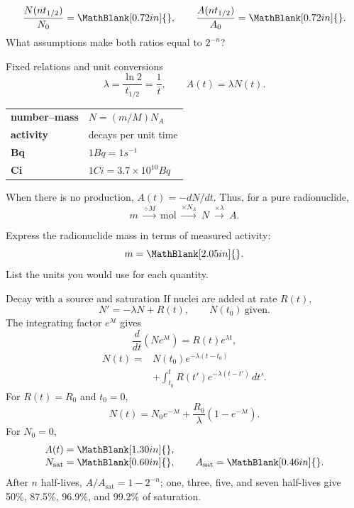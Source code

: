 \begin{handoutcolumns}
\begin{checkpoint}
\[
 \frac{N(nt_{1/2})}{N_0}=\MathBlank[0.72in]{},
 \qquad
 \frac{A(nt_{1/2})}{A_0}=\MathBlank[0.72in]{}.
\]
What assumptions make both ratios equal to $2^{-n}$?
\end{checkpoint}

\switchcolumn


\begin{fixedbox}{Fixed relations and unit conversions}
\[
 \boxed{\lambda=\frac{\ln 2}{t_{1/2}}=\frac{1}{\bar t}},
 \qquad
 \boxed{A(t)=\lambda N(t)}.
\]
\scriptsize
\begin{tabularx}{\linewidth}{@{}>{\bfseries}l X@{}}
number--mass & $N=(m/M)N_A$\\
activity & decays per unit time\\
Bq & $1\unit{Bq}=1\unit{s^{-1}}$\\
Ci & $1\unit{Ci}=3.7\times10^{10}\unit{Bq}$
\end{tabularx}
\normalsize
When there is no production, $A(t)=-dN/dt$. Thus, for a pure radionuclide,
\[
 m\ \xrightarrow{\div M}\ \mathrm{mol}
 \ \xrightarrow{\times N_A}\ N
 \ \xrightarrow{\times\lambda}\ A.
\]
\end{fixedbox}

\begin{checkpoint}
Express the radionuclide mass in terms of measured activity:
\[
 m=\MathBlank[2.05in]{}.
\]
List the units you would use for each quantity.
\end{checkpoint}


\begin{boardbox}{Decay with a source and saturation}
\footnotesize
If nuclei are added at rate $R(t)$,
\[
 \boxed{N'=-\lambda N+R(t)},\qquad N(t_0)\ \text{given}.
\]
The integrating factor $e^{\lambda t}$ gives
\[
 \frac{d}{dt}\!\left(Ne^{\lambda t}\right)=R(t)e^{\lambda t},
\]
\[
 \boxed{\begin{aligned}
 N(t)={}&N(t_0)e^{-\lambda(t-t_0)}\\[-2pt]
 &+\int_{t_0}^{t}R(t')e^{-\lambda(t-t')}\,dt'.
 \end{aligned}}
\]
For $R(t)=R_0$ and $t_0=0$,
\[
 \boxed{N(t)=N_0e^{-\lambda t}
 +\frac{R_0}{\lambda}\left(1-e^{-\lambda t}\right)}.
\]
For $N_0=0$,
\[
 \begin{aligned}
 A(t)&=\MathBlank[1.30in]{},\\[-2pt]
 N_{\mathrm{sat}}&=\MathBlank[0.60in]{},\qquad
 A_{\mathrm{sat}}=\MathBlank[0.46in]{}.
 \end{aligned}
\]
After $n$ half-lives, $A/A_{\mathrm{sat}}=1-2^{-n}$; one, three, five, and
seven half-lives give 50\%, 87.5\%, 96.9\%, and 99.2\% of saturation.
\normalsize
\end{boardbox}

\end{handoutcolumns}

